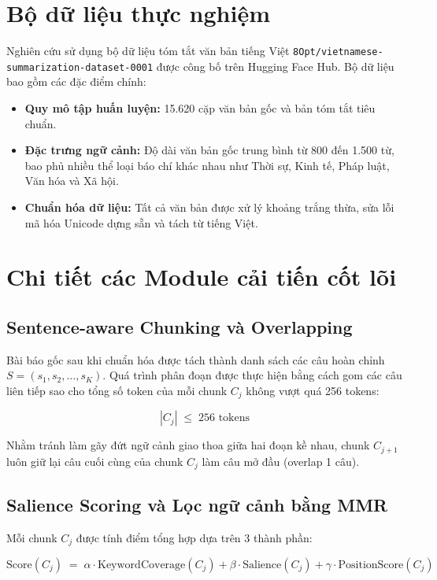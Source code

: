 \section{Bộ dữ liệu thực nghiệm}

Nghiên cứu sử dụng bộ dữ liệu tóm tắt văn bản tiếng Việt \texttt{8Opt/vietnamese-summarization-dataset-0001} được công bố trên Hugging Face Hub. Bộ dữ liệu bao gồm các đặc điểm chính:

\begin{itemize}
  \item \textbf{Quy mô tập huấn luyện:} 15.620 cặp văn bản gốc và bản tóm tắt tiêu chuẩn.
  \item \textbf{Đặc trưng ngữ cảnh:} Độ dài văn bản gốc trung bình từ 800 đến 1.500 từ, bao phủ nhiều thể loại báo chí khác nhau như Thời sự, Kinh tế, Pháp luật, Văn hóa và Xã hội.
  \item \textbf{Chuẩn hóa dữ liệu:} Tất cả văn bản được xử lý khoảng trắng thừa, sửa lỗi mã hóa Unicode dựng sẵn và tách từ tiếng Việt.
\end{itemize}

\section{Chi tiết các Module cải tiến cốt lõi}

\subsection{Sentence-aware Chunking và Overlapping}

Bài báo gốc sau khi chuẩn hóa được tách thành danh sách các câu hoàn chỉnh $S = (s_1, s_2, \ldots, s_K)$. Quá trình phân đoạn được thực hiện bằng cách gom các câu liên tiếp sao cho tổng số token của mỗi chunk $C_j$ không vượt quá 256 tokens:

\[
|C_j| \;\le\; 256 \text{ tokens}
\]

Nhằm tránh làm gãy đứt ngữ cảnh giao thoa giữa hai đoạn kề nhau, chunk $C_{j+1}$ luôn giữ lại câu cuối cùng của chunk $C_j$ làm câu mở đầu (overlap 1 câu).

\subsection{Salience Scoring và Lọc ngữ cảnh bằng MMR}

Mỗi chunk $C_j$ được tính điểm tổng hợp dựa trên 3 thành phần:

\[
\text{Score}(C_j) \;=\; \alpha \cdot \text{KeywordCoverage}(C_j) + \beta \cdot \text{Salience}(C_j) + \gamma \cdot \text{PositionScore}(C_j)
\]

